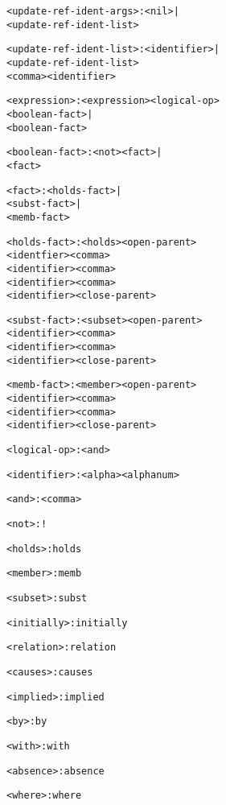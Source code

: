 \documentclass[11pt]{report}
\newenvironment{vverbatim}
{
  \begin{alltt}
}
{
    \vspace{-\baselineskip}
  \end{alltt}
}
\begin{document}
\begin{vverbatim}
<update-ref-ident-args>  : <nil> |
                           <update-ref-ident-list>

<update-ref-ident-list>  : <identifier> |
                           <update-ref-ident-list>
                           <comma> <identifier>

<expression>             : <expression> <logical-op>
                           <boolean-fact> |
                           <boolean-fact>

<boolean-fact>           : <not> <fact> |
                           <fact>

<fact>                   : <holds-fact> |
                           <subst-fact> |
                           <memb-fact>

<holds-fact>             : <holds> <open-parent>
                           <identfier> <comma>
                           <identifier> <comma>
                           <identifier> <comma>
                           <identifier> <close-parent>

<subst-fact>             : <subset> <open-parent>
                           <identifier> <comma>
                           <identifier> <comma>
                           <identifier> <close-parent>

<memb-fact>              : <member> <open-parent>
                           <identifier> <comma>
                           <identifier> <comma>
                           <identifier> <close-parent>

<logical-op>             : <and>

<identifier>             : <alpha> <alphanum>

<and>                    : <comma>

<not>                    : !

<holds>                  : holds

<member>                 : memb

<subset>                 : subst

<initially>              : initially

<relation>               : relation

<causes>                 : causes

<implied>                : implied

<by>                     : by

<with>                   : with

<absence>                : absence

<where>                  : where


\end{vverbatim}
\end{document}
